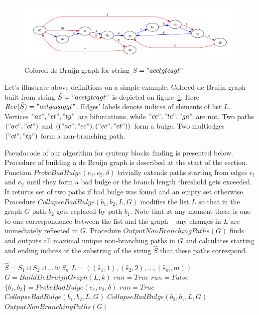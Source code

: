 \documentclass[a4paper, 12pt]{scrartcl}
\begin{document}
\begin{figure}
	\includegraphics[scale = 0.50]{graph3.pdf}
	\small \caption{Colored de Bruijn graph for string \(S = "acctgtcagt" \) }
	\label{ColoredDeBruijn}
\end{figure}

Let's illustrate above definitions on a simple example. Colored de Bruijn graph built from string \(\hat{S} = "acctgtcagt"\)
is depicted on figure~\ref{ColoredDeBruijn}. Here \(Rev(\hat{S}) = "actgacaggt"\). Edges' labels denote indices of elements of
list \(L\). Vertices \("ac", "ct", "tg"\) are bifurcations, while \("cc", "tc", "ga"\) are not. Two paths \(("ac", "ct")\) and \((("ac", "cc"), ("cc", "ct"))\)
form a bulge. Two multiedges \(("ct", "tg")\) form a non-branching path.

Pseudocode of our algorithm for synteny blocks finding is presented below. Procedure of building a de Bruijn graph is described at the start of the section.
Function \(ProbeBadBulge(e_1, e_2,  \delta)\) trivially extends paths starting from edges \(e_1\) and \(e_2\) until they form a bad bulge or the branch length
threshold gets exceeded. It returns set of two paths if bad bulge was found and an empty set otherwise.
Procedure \(CollapseBadBulge(b_1, b_2, L, G)\) modifies the list \(L\) so that in the graph \(G\) path \(b_2\) gets replaced by path \(b_1\). 
Note that at any moment there is one-to-one correspondence between the list and the graph -- any changes in \(L\) are immediately reflected in \(G\).
Procedure \(OutputNonBranchingPaths(G)\) finds and outputs all maximal unique non-branching paths in \(G\)
and calculates starting and ending indices of the substring of the string \(\hat{S}\) that these paths correspond.

\begin{algorithm}[H]               
\small \caption*{\(SyntenyFinder(S = \lbrace S_{1}, S_{2}, \ldots, S_{n} \rbrace,  k, \delta)\)} 
\label{Pseudocode}
\begin{algorithmic}[1]     
\State \(\hat{S} = S_{1} \uplus S_{2} \uplus \ldots \uplus S_{n} \)
\State \(L = ((\hat{s}_1, 1), (\hat{s}_2, 2), \ldots, (\hat{s}_{m}, m))\)
\State \(G = BuildDeBruijnGraph(L, k)\)
\State \(run = True\)
	\State \(run = False\)
			\State \(\lbrace b_1, b_2 \rbrace = ProbeBadBulge(e_1, e_2,  \delta) \)
				\State \(run = True\)
					\State \(CollapseBadBulge(b_1, b_2, L, G)\)
				\Else	
					\State \(CollapseBadBulge(b_2, b_1, L, G)\)
				\EndIf
			\EndIf
		\EndFor
	\EndFor
\EndWhile
\State \(OutputNonBranchingPaths(G)\)
\end{algorithmic}
\end{algorithm}
\end{document}
